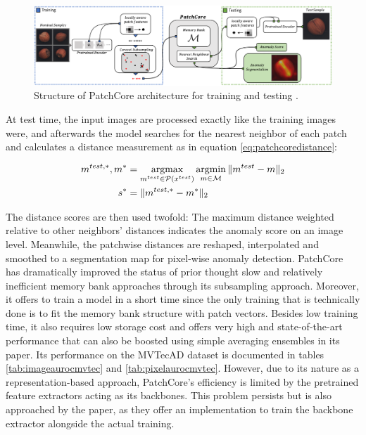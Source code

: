 \begin{figure}[H]
\centering
 \includegraphics[width=\textwidth]{figures/pathcore_architecture.png}
 \caption{Structure of PatchCore architecture for training and testing \cite{patchCore2022}.}
 \label{fig:patchcorearchitecture}
\end{figure}

At test time, the input images are processed exactly like the training images were, and afterwards the model searches for the nearest neighbor of each patch and calculates a distance measurement as 
in equation \ref{eq:patchcoredistance}:

\begin{equation}
\label{eq:patchcoredistance}
\begin{split}
m^{test, *}, m^{*} &= \operatorname*{argmax}_{m^{test} \in \mathcal{P}(x^{test})} \operatorname*{argmin}_{m \in \mathcal{M}} \| m^{test} - m \|_{2} \\
s^{*} &= \| m^{test, *} - m^{*} \|_{2}
\end{split}
\end{equation}

The distance scores are then used twofold: The maximum distance weighted relative to other neighbors' distances indicates the anomaly score on an image level. Meanwhile, the patchwise distances are reshaped, 
interpolated and smoothed to a segmentation map for pixel-wise anomaly detection.
\newline
PatchCore has dramatically improved the status of prior thought slow and relatively inefficient memory bank approaches through its subsampling approach. Moreover, it offers to train a model in a short time 
since the only training that is technically done is to fit the memory bank structure with patch vectors. Besides low training time, it also requires low storage cost and offers very high and state-of-the-art 
performance that can also be boosted using simple averaging ensembles in its paper. Its performance on the MVTecAD dataset \cite{MVTEC_Bergmann_2021} is documented in tables \ref{tab:imageaurocmvtec} and \ref{tab:pixelaurocmvtec}. However, due to its nature as a representation-based approach, PatchCore's 
efficiency is limited by the pretrained feature extractors acting as its backbones. This problem persists but is also approached by the paper, as they offer an implementation to train the backbone 
extractor alongside the actual training.


